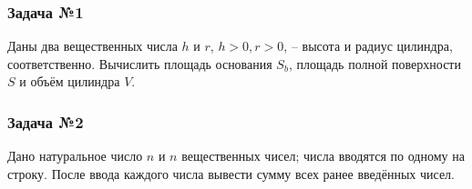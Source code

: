 \documentclass[12pt,a5paper,landscape]{article}
\begin{document}
\subsubsection*{Задача №1}
Даны два вещественных числа $h$ и $r$, $h>0, r>0$, -- высота и радиус цилиндра, соответственно. Вычислить площадь основания $S_b$, площадь полной поверхности $S$ и объём цилиндра $V$.
\subsubsection*{Задача №2}
Дано натуральное число $n$ и $n$ вещественных чисел; числа вводятся по одному на строку. После ввода каждого числа вывести сумму всех ранее введённых чисел.
\end{document}
